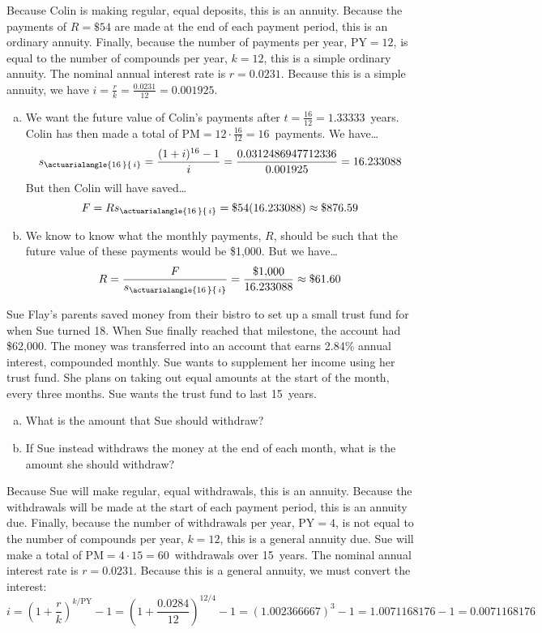\documentclass[11pt,letterpaper]{article}
\newcommand{\actS}[2]{s_{\actuarialangle{#1\,}{\,#2}}} %
\begin{document}
\sol Because Colin is making regular, equal deposits, this is an annuity. Because the payments of $R= \$54$ are made at the end of each payment period, this is an ordinary annuity. Finally, because the number of payments per year, $\text{PY}= 12$, is equal to the number of compounds per year, $k= 12$, this is a simple ordinary annuity. The nominal annual interest rate is $r= 0.0231$. Because this is a simple annuity, we have $i= \frac{r}{k}= \frac{0.0231}{12}= 0.001925$. 

\begin{enumerate}[(a)]
\item We want the future value of Colin's payments after $t= \frac{16}{12}= 1.33333$~years. Colin has then made a total of $\text{PM}= 12 \cdot \frac{16}{12}= 16$~payments. We have\dots
	\[
	\actS{16}{i}= \dfrac{(1 + i)^{16} - 1}{i}= \dfrac{0.0312486947712336}{0.001925}= 16.233088
	\]
But then Colin will have saved\dots
	\[
	F= R \actS{16}{i}= \$54(16.233088) \approx \$876.59
	\] \pspace

\item We know to know what the monthly payments, $R$, should be such that the future value of these payments would be \$1,000. But we have\dots
	\[
	R= \dfrac{F}{\actS{16}{i}}= \dfrac{\$1,\!000}{16.233088} \approx \$61.60
	\]
\end{enumerate}



\newpage



 Sue Flay's parents saved money from their bistro to set up a small trust fund for when Sue turned 18. When Sue finally reached that milestone, the account had \$62,000. The money was transferred into an account that earns 2.84\% annual interest, compounded monthly. Sue wants to supplement her income using her trust fund. She plans on taking out equal amounts at the start of the month, every three months. Sue wants the trust fund to last 15~years. 
	\begin{enumerate}[(a)]
	\item  What is the amount that Sue should withdraw?
	\item If Sue instead withdraws the money at the end of each month, what is the amount she should withdraw? 
	\end{enumerate} \pspace

\sol Because Sue will make regular, equal withdrawals, this is an annuity. Because the withdrawals will be made at the start of each payment period, this is an annuity due. Finally, because the number of withdrawals per year, $\text{PY}= 4$, is not equal to the number of compounds per year, $k= 12$, this is a general annuity due. Sue will make a total of $\text{PM}= 4 \cdot 15= 60$~withdrawals over 15~years. The nominal annual interest rate is $r= 0.0231$. Because this is a general annuity, we must convert the interest:
	\[
	i= \left(1 + \dfrac{r}{k} \right)^{k/\text{PY}} - 1= \left(1 + \dfrac{0.0284}{12} \right)^{12/4} - 1= (1.002366667)^3 - 1= 1.0071168176 - 1= 0.0071168176 
	\]
\end{document}
